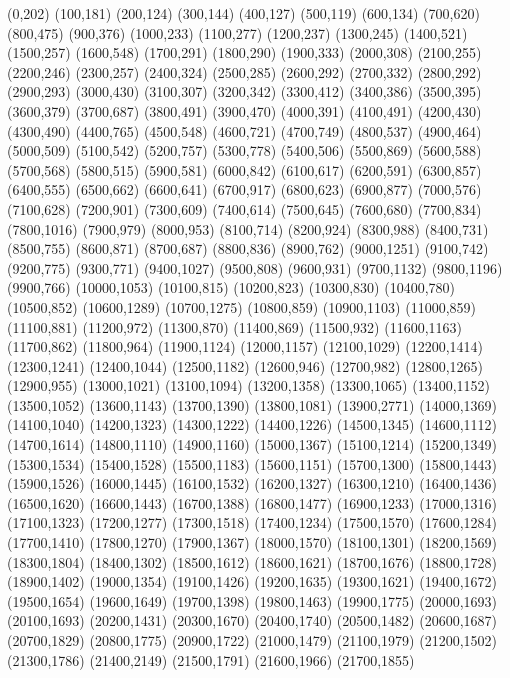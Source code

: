 (0,202)
(100,181)
(200,124)
(300,144)
(400,127)
(500,119)
(600,134)
(700,620)
(800,475)
(900,376)
(1000,233)
(1100,277)
(1200,237)
(1300,245)
(1400,521)
(1500,257)
(1600,548)
(1700,291)
(1800,290)
(1900,333)
(2000,308)
(2100,255)
(2200,246)
(2300,257)
(2400,324)
(2500,285)
(2600,292)
(2700,332)
(2800,292)
(2900,293)
(3000,430)
(3100,307)
(3200,342)
(3300,412)
(3400,386)
(3500,395)
(3600,379)
(3700,687)
(3800,491)
(3900,470)
(4000,391)
(4100,491)
(4200,430)
(4300,490)
(4400,765)
(4500,548)
(4600,721)
(4700,749)
(4800,537)
(4900,464)
(5000,509)
(5100,542)
(5200,757)
(5300,778)
(5400,506)
(5500,869)
(5600,588)
(5700,568)
(5800,515)
(5900,581)
(6000,842)
(6100,617)
(6200,591)
(6300,857)
(6400,555)
(6500,662)
(6600,641)
(6700,917)
(6800,623)
(6900,877)
(7000,576)
(7100,628)
(7200,901)
(7300,609)
(7400,614)
(7500,645)
(7600,680)
(7700,834)
(7800,1016)
(7900,979)
(8000,953)
(8100,714)
(8200,924)
(8300,988)
(8400,731)
(8500,755)
(8600,871)
(8700,687)
(8800,836)
(8900,762)
(9000,1251)
(9100,742)
(9200,775)
(9300,771)
(9400,1027)
(9500,808)
(9600,931)
(9700,1132)
(9800,1196)
(9900,766)
(10000,1053)
(10100,815)
(10200,823)
(10300,830)
(10400,780)
(10500,852)
(10600,1289)
(10700,1275)
(10800,859)
(10900,1103)
(11000,859)
(11100,881)
(11200,972)
(11300,870)
(11400,869)
(11500,932)
(11600,1163)
(11700,862)
(11800,964)
(11900,1124)
(12000,1157)
(12100,1029)
(12200,1414)
(12300,1241)
(12400,1044)
(12500,1182)
(12600,946)
(12700,982)
(12800,1265)
(12900,955)
(13000,1021)
(13100,1094)
(13200,1358)
(13300,1065)
(13400,1152)
(13500,1052)
(13600,1143)
(13700,1390)
(13800,1081)
(13900,2771)
(14000,1369)
(14100,1040)
(14200,1323)
(14300,1222)
(14400,1226)
(14500,1345)
(14600,1112)
(14700,1614)
(14800,1110)
(14900,1160)
(15000,1367)
(15100,1214)
(15200,1349)
(15300,1534)
(15400,1528)
(15500,1183)
(15600,1151)
(15700,1300)
(15800,1443)
(15900,1526)
(16000,1445)
(16100,1532)
(16200,1327)
(16300,1210)
(16400,1436)
(16500,1620)
(16600,1443)
(16700,1388)
(16800,1477)
(16900,1233)
(17000,1316)
(17100,1323)
(17200,1277)
(17300,1518)
(17400,1234)
(17500,1570)
(17600,1284)
(17700,1410)
(17800,1270)
(17900,1367)
(18000,1570)
(18100,1301)
(18200,1569)
(18300,1804)
(18400,1302)
(18500,1612)
(18600,1621)
(18700,1676)
(18800,1728)
(18900,1402)
(19000,1354)
(19100,1426)
(19200,1635)
(19300,1621)
(19400,1672)
(19500,1654)
(19600,1649)
(19700,1398)
(19800,1463)
(19900,1775)
(20000,1693)
(20100,1693)
(20200,1431)
(20300,1670)
(20400,1740)
(20500,1482)
(20600,1687)
(20700,1829)
(20800,1775)
(20900,1722)
(21000,1479)
(21100,1979)
(21200,1502)
(21300,1786)
(21400,2149)
(21500,1791)
(21600,1966)
(21700,1855)
